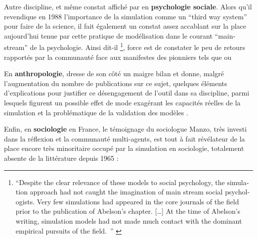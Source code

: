 Autre discipline, et même constat affiché par \textcite{Ostrom1988} en \textbf{psychologie sociale}. Alors qu'il revendique en 1988 l'importance de la simulation comme un \foreignquote{english}{third way system} pour faire de la science, il fait également un constat assez accablant sur la place aujourd'hui tenue par cette pratique de modélisation dans le courant \foreignquote{english}{mainstream} de la psychologie. Ainsi dit-il \footnote{ \foreignquote{english}{Despite the clear relevance of these models to  social psychology, the simulation approach had not caught the imagination of main stream social psychologists. Very few simulations had appeared in the core journals of the field prior to the publication of Abelson's chapter. […] At the time of Abelson's writing, simulation models had not made much contact with the dominant empirical pursuits of the field. } \autocite[382]{Ostrom1988}}, force est de constater le peu de retours rapportés par la communauté face aux manifestes des pionniers tels que \textcite{Gullahorn1965} ou \textcite{Abelson1968} 

En \textbf{anthropologie}, \textcite{Dyke1981} dresse de son côté un maigre bilan et donne, malgré l'augmentation du nombre de publications sur ce sujet, quelques éléments d'explications pour justifier ce désengagement de l'outil dans sa discipline, parmi lesquels figurent un possible effet de mode exagérant les capacités réelles de la simulation et la problématique de la validation des modèles . 

Enfin, en \textbf{sociologie} en France, le témoignage du sociologue Manzo, très investi dans la réflexion et la communauté multi-agents, est tout à fait révélateur de la place encore très minoritaire occupé par la simulation en sociologie, totalement absente de la littérature depuis 1965 : 

